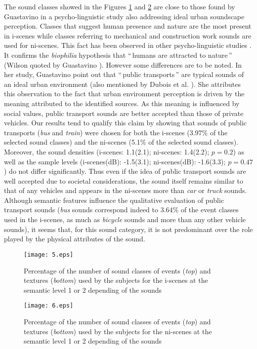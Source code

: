 \documentclass[12pt, titlepage, reqno]{article} %
\begin{document}
The sound classes showed in the Figures \ref{tagI} and \ref{tagNI} are close to those found by Guastavino \cite{guastavino_ideal_2006} in a psycho-linguistic study also addressing  ideal urban soundscape perception. Classes that suggest human presence and nature are the most present in i-scenes while classes referring to mechanical and construction work sounds are used for ni-scenes. This fact has been observed in other psycho-linguistic studies \cite{dubois2006cognitive, raimbault_urban_2005, guastavino_categorization_2007}. It confirms the \textit{biophilia} hypothesis that ``\,humans are attracted to nature\,'' (Wilson quoted by Guastavino \cite{guastavino_ideal_2006}). However some differences are to be noted. In her study, Guastavino \cite{guastavino_ideal_2006} point out that ``\,public transports\,'' are typical sounds of an ideal urban environment (also mentioned by Dubois et al. \cite{dubois2006cognitive}). She attributes this observation to the fact that urban environment perception is driven by the meaning attributed to the identified sources. As this meaning is influenced by social values, public transport sounds are better accepted than those of private vehicles. Our results tend to qualify this claim  by showing that sounds of public transports (\textit{bus} and \textit{train}) were chosen for both the i-scenes (3.97\% of the selected sound classes) and the ni-scenes (5.1\% of the selected sound classes). Moreover, the sound densities  (i-scenes: 1.1(2.1); ni-scenes: 1.4(2.2);  $p=0.2$) as well as the sample levels (i-scenes(dB): -1.5(3.1); ni-scenes(dB): -1.6(3.3);  $p=0.47$) do not differ significantly. Thus even if the idea of public transport sounds are well accepted due to societal considerations, the sound itself remains similar to that of any vehicles and appears in the ni-scenes more than \textit{car} or \textit{truck} sounds. Although semantic features influence the qualitative evaluation of public transport sounds (\textit{bus} sounds correspond indeed to 3.64\% of the event classes used in the i-scenes, as much as \textit{bicycle} sounds and more than any other vehicle sounds), it seems that, for this sound category, it is not predominant over the role played by the physical attributes of the sound. 

\begin{figure}[t!]
\texttt{[image: 5.eps]} 
    \caption{\label{tagI}  Percentage of the number of sound classes of events (\textit{top}) and textures (\textit{bottom}) used by the subjects for the i-scenes at the semantic level 1 or 2 depending of the sounds}
\end{figure}
\begin{figure}[t!]
\texttt{[image: 6.eps]}
    \caption{\label{tagNI}  Percentage of the number of sound classes of events (\textit{top}) and textures (\textit{bottom}) used by the subjects for the ni-scenes at the semantic level 1 or 2 depending of the sounds}
\end{figure}
\end{document}
